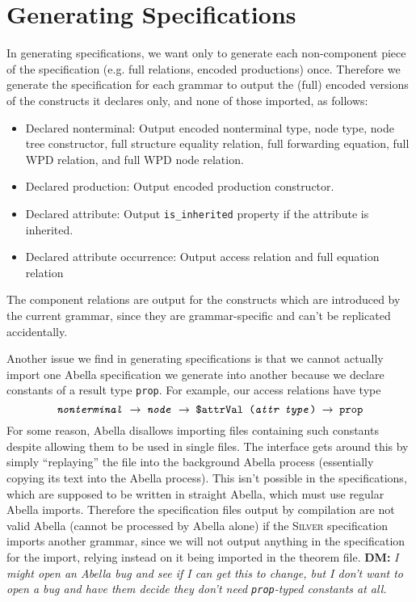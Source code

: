 \documentclass[11pt]{article}
\newcommand{\tyarrow}{\ensuremath{\rightarrow}}
\newcommand{\silver}{\textsc{Silver}}
\newcommand{\dnote}[1]{{\color{orange} \textbf{DM:} \emph{#1}}}
\begin{document}
\section{Generating Specifications} \label{sec:generation}

In generating specifications, we want only to generate each
non-component piece of the specification (e.g. full relations, encoded
productions) once.  Therefore we generate the specification for each
grammar to output the (full) encoded versions of the constructs it
declares only, and none of those imported, as follows:
\begin{itemize}
\item Declared nonterminal:  Output encoded nonterminal type, node
  type, node tree constructor, full structure equality relation, full
  forwarding equation, full WPD relation, and full WPD node relation.
\item Declared production:  Output encoded production constructor.
\item Declared attribute:  Output \texttt{is\_inherited} property if
  the attribute is inherited.
\item Declared attribute occurrence:  Output access relation and full
  equation relation
\end{itemize}
The component relations are output for the constructs which are
introduced by the current grammar, since they are grammar-specific and
can't be replicated accidentally.


Another issue we find in generating specifications is that we cannot
actually import one Abella specification we generate into another
because we declare constants of a result type \texttt{prop}.  For
example, our access relations have type
\[\texttt{\textit{nonterminal} \tyarrow{} \textit{node} \tyarrow{} \$attrVal
  (\textit{attr type}) \tyarrow{} prop}\]
%
For some reason, Abella disallows importing files containing such
constants despite allowing them to be used in single files.  The
interface gets around this by simply ``replaying'' the file into the
background Abella process (essentially copying its text into the
Abella process).  This isn't possible in the specifications, which are
supposed to be written in straight Abella, which must use regular
Abella imports.  Therefore the specification files output by
compilation are not valid Abella (cannot be processed by Abella alone)
if the \silver{} specification imports another grammar, since we will
not output anything in the specification for the import, relying
instead on it being imported in the theorem file.
\dnote{I might open an Abella bug and see if I can get this to change,
  but I don't want to open a bug and have them decide they don't need
  \texttt{prop}-typed constants at all.}
\end{document}
